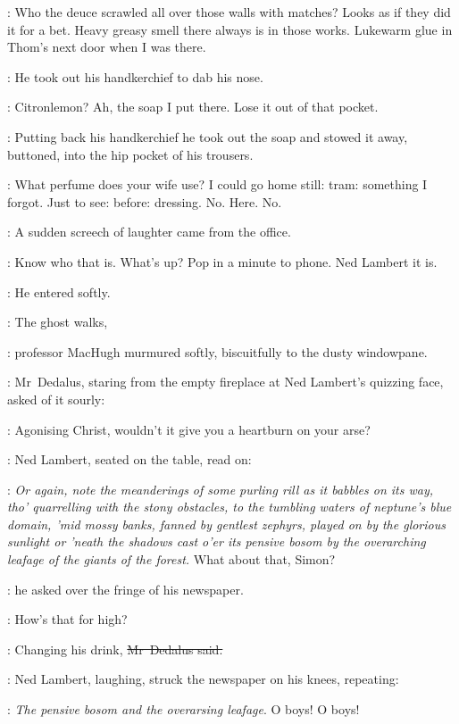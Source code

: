 \BloomInt:
Who the deuce scrawled all over those walls with matches?
Looks as if they did it for a bet.
Heavy greasy smell there always is in those works.
Lukewarm glue in Thom's next door when I was there.

:
He took out his handkerchief to dab his nose.

\BloomInt:
Citronlemon?
Ah, the soap I put there.
Lose it out of that pocket.

:
Putting back his handkerchief
he took out the soap and stowed it away,
buttoned,
into the hip pocket of his trousers.

\BloomInt:
What perfume does your wife use?
I could go home still:
tram: something I forgot.
Just to see: before:
dressing.
No.
Here.
No.

:
A sudden screech of laughter came from the  office.

\BloomInt:
Know who that is.
What's up?
Pop in a minute to phone.
Ned Lambert it is.

:
He entered softly.



\machugh:
The ghost walks,

:
professor MacHugh murmured softly, biscuitfully
to the dusty windowpane.

:
Mr~Dedalus,
staring from the empty fireplace at Ned Lambert's quizzing face,
asked of it sourly:

\simon:
Agonising Christ,
wouldn't it give you a heartburn on your arse?

:
Ned Lambert, seated on the table, read on:

\lambert:
\emph{%
Or again, note the meanderings of some purling rill
as it babbles on its way,
tho' quarrelling with the stony obstacles,
to the tumbling waters of neptune's blue domain,
'mid mossy banks,
fanned by gentlest zephyrs,
played on by the glorious sunlight
or 'neath the shadows cast o'er its pensive bosom
by the overarching leafage of the giants of the forest.}
What about that, Simon?

:
he asked over the fringe of his newspaper.

\lambert:
How's that for high?

\simon:
Changing his drink,
\sout{Mr~Dedalus said.}

:
Ned Lambert, laughing,
struck the newspaper on his knees,
repeating:

\lambert:
\emph{The pensive bosom and the overarsing leafage}.
O boys!
O boys!

